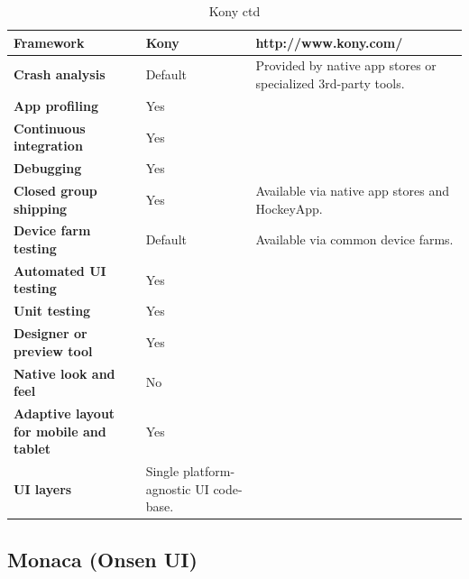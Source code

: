 \documentclass[english,master,public,dept460,male,cpdeclaration,oneside]{diploma}
\begin{document}
\begin{table}[!h]
	\centering
	\caption{Kony ctd}
	\begin{tabular}{p{} | p{} | p{}}
		\toprule		
		\textbf{Framework} & \textbf{Kony} & http://www.kony.com/ \\
		\midrule
		\textbf{Crash analysis} & Default & Provided by native app stores or specialized 3rd-party tools. \\			
		\midrule
		\textbf{App profiling} & Yes & \\			
		\midrule
		\textbf{Continuous integration} & Yes & \\			
		\midrule
		\textbf{Debugging} & Yes & \\			
		\midrule
		\textbf{Closed group shipping} & Yes & Available via native app stores and HockeyApp. \\			
		\midrule
		\textbf{Device farm testing} & Default & Available via common device farms. \\			
		\midrule
		\textbf{Automated UI testing} & Yes & \\			
		\midrule
		\textbf{Unit testing} & Yes & \\			
		\midrule
		\textbf{Designer or preview tool} & Yes & \\			
		\midrule
		\textbf{Native look and feel} & No & \\			
		\midrule
		\textbf{Adaptive layout for mobile and tablet} & Yes & \\			
		\midrule		
		\textbf{UI layers} & Single platform-agnostic UI code-base. &  \\			
		\midrule
	\end{tabular}
\end{table}

\clearpage
\subsection{Monaca (Onsen UI)}
\end{document}
